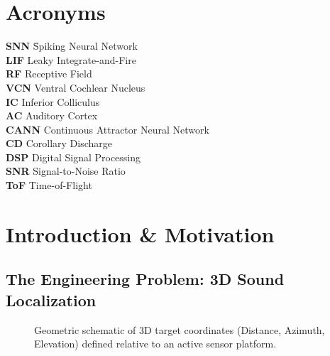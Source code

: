 \documentclass[12pt,a4paper]{report}
\begin{document}
\chapter*{Acronyms}

\begin{tabbing}
    \textbf{SNN} \qquad \= Spiking Neural Network \\
    \textbf{LIF} \> Leaky Integrate-and-Fire \\
    \textbf{RF} \> Receptive Field \\
    \textbf{VCN} \> Ventral Cochlear Nucleus \\
    \textbf{IC} \> Inferior Colliculus \\
    \textbf{AC} \> Auditory Cortex \\
    \textbf{CANN} \> Continuous Attractor Neural Network \\
    \textbf{CD} \> Corollary Discharge \\
    \textbf{DSP} \> Digital Signal Processing \\
    \textbf{SNR} \> Signal-to-Noise Ratio \\
    \textbf{ToF} \> Time-of-Flight
\end{tabbing}

\newpage
{}

\chapter{Introduction \& Motivation}
\label{ch:intro}

\section{The Engineering Problem: 3D Sound Localization}
\label{sec:problem}

\begin{figure}[htbp]
    \centering
    \caption{Geometric schematic of 3D target coordinates (Distance, Azimuth, Elevation) defined relative to an active sensor platform.}
    \label{fig:3d_space}
\end{figure}
\end{document}
